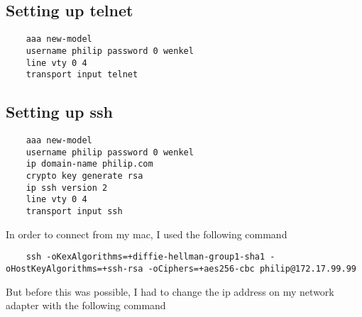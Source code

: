 \documentclass{article}
\begin{document}
\subsection{Setting up telnet}
\begin{verbatim}
	aaa new-model
	username philip password 0 wenkel
	line vty 0 4
	transport input telnet
\end{verbatim}

\subsection{Setting up ssh}
\begin{verbatim}
	aaa new-model
	username philip password 0 wenkel
	ip domain-name philip.com
	crypto key generate rsa
	ip ssh version 2
	line vty 0 4
	transport input ssh
\end{verbatim}

In order to connect from my mac, I used the following command 

\begin{verbatim}
	ssh -oKexAlgorithms=+diffie-hellman-group1-sha1 -oHostKeyAlgorithms=+ssh-rsa -oCiphers=+aes256-cbc philip@172.17.99.99
\end{verbatim}

But before this was possible, I had to change the ip address on my network adapter with the following command
\end{document}
